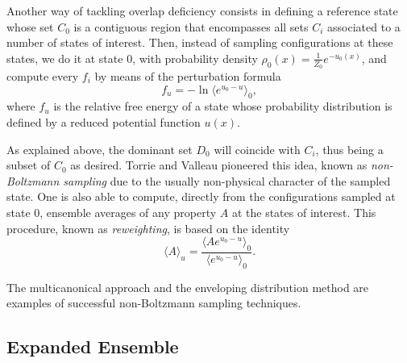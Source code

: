 \documentclass[aip,jcp,reprint,amsmath,amssymb]{revtex4-1}
\begin{document}
Another way of tackling overlap deficiency consists in defining a reference state whose set $C_0$ is a contiguous region that encompasses all sets $C_i$ associated to a number of states of interest. Then, instead of sampling configurations at these states, we do it at state $0$, with probability density $\rho_0(x) = \frac{1}{Z_0} e^{-u_0(x)}$, and compute every $f_i$ by means of the perturbation formula
\begin{equation}
\label{eq:nbs sampling free energy}
f_u = -\ln \langle e^{u_0-u} \rangle_0,
\end{equation}
where $f_u$ is the relative free energy of a state whose probability distribution is defined by a reduced potential function $u(x)$.

As explained above, the dominant set $D_0$ will coincide with $C_i$, thus being a subset of $C_0$ as desired. Torrie and Valleau\cite{Torrie_1977} pioneered this idea, known as \textit{non-Boltzmann sampling} due to the usually non-physical character of the sampled state. One is also able to compute, directly from the configurations sampled at state $0$, ensemble averages of any property $A$ at the states of interest. This procedure, known as \textit{reweighting}, is based on the identity\cite{Torrie_1977}
\begin{equation}
\label{eq:nbs sampling reweighting}
\langle A \rangle_u = \frac{\langle A e^{u_0 - u} \rangle_0}{\langle e^{u_0 - u} \rangle_0}. %
\end{equation}

The multicanonical approach\cite{Berg_1992, Lee_1993, Abreu_2006} and the enveloping distribution method\cite{Christ_2007, *Christ_2008, *Christ_2009} are examples of successful non-Boltzmann sampling techniques.

\subsection{Expanded Ensemble}
\label{sec:expanded ensemble}
	
\end{document}
